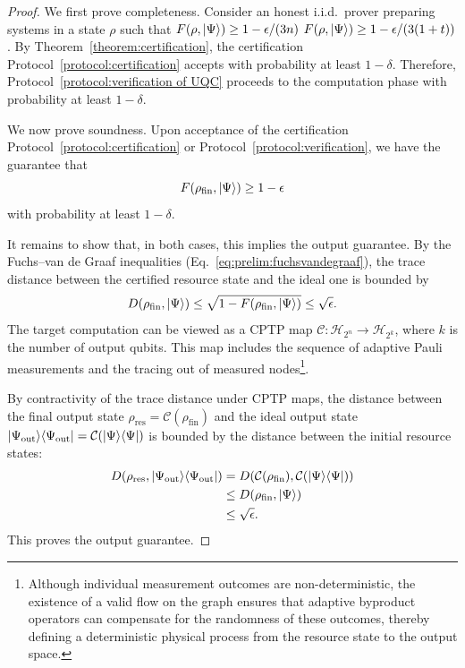 \documentclass[a4paper,twocolumn,11pt,unpublished]{../../revision/quantumarticle}
\newcommand{\ketbra}[1]{\ket{#1}\!\bra{#1}}
\providecommand{\DIFadd}[1]{{\protect\color{blue} \sf #1}} %
\providecommand{\DIFdel}[1]{{\protect\color{red} \scriptsize #1}} %
\providecommand{\DIFaddbegin}{} %
\providecommand{\DIFaddend}{} %
\providecommand{\DIFdelbegin}{} %
\providecommand{\DIFdelend}{} %
\begin{document}
\begin{proof}
    We first prove completeness. Consider an honest i.i.d.\ prover preparing systems in a state $\rho$ such that \DIFdelbegin \DIFdel{$F(\rho,\ket{\Psi})\geq 1-\epsilon/(3n)$}\DIFdelend \DIFaddbegin \DIFadd{$F(\rho,\ket{\Psi})\geq 1-\epsilon/(3(1+t))$}\DIFaddend . By Theorem~\ref{theorem:certification}, the certification Protocol~\ref{protocol:certification} accepts with probability at least $1-\delta$. Therefore, Protocol~\ref{protocol:verification of UQC} proceeds to the computation phase with probability at least $1-\delta$.

    We now prove soundness. Upon acceptance of the certification Protocol~\ref{protocol:certification} or Protocol~\ref{protocol:verification}, we have the guarantee that
    \begin{equation}
        F(\rho_{\mathrm{fin}}, \ket\Psi) \geq 1-\epsilon
    \end{equation}
    with probability at least $1-\delta$.

    It remains to show that, in both cases, this implies the output guarantee. By the Fuchs--van de Graaf inequalities (Eq.~\eqref{eq:prelim:fuchsvandegraaf}), the trace distance between the certified resource state and the ideal one is bounded by
    \begin{equation}
        D(\rho_{\mathrm{fin}}, \ket\Psi) \leq \sqrt{1 - F(\rho_{\mathrm{fin}}, \ket\Psi)} \leq \sqrt{\epsilon}.
    \end{equation}
    The target computation can be viewed as a CPTP map $\mathcal{C}: \mathcal{H}_{2^n} \to \mathcal{H}_{2^k}$, where $k$ is the number of output qubits. This map includes the sequence of adaptive Pauli measurements and the tracing out of measured nodes\footnote{Although individual measurement outcomes are non-deterministic, the existence of a valid flow on the graph ensures that adaptive byproduct operators can compensate for the randomness of these outcomes, thereby defining a deterministic physical process from the resource state to the output space.}.

    By contractivity of the trace distance under CPTP maps, the distance between the final output state $\rho_{\mathrm{res}} = \mathcal{C}(\rho_{\mathrm{fin}})$ and the ideal output state $\ketbra{\Psi_{\rm out}} = \mathcal{C}(\ketbra{\Psi})$ is bounded by the distance between the initial resource states:
    \begin{align}
        D(\rho_{\mathrm{res}}, \ketbra{\Psi_{\rm out}})
        &= D(\mathcal{C}(\rho_{\mathrm{fin}}), \mathcal{C}(\ketbra{\Psi})) \nonumber \\
        &\leq D(\rho_{\mathrm{fin}}, \ket{\Psi}) \nonumber \\
        &\leq \sqrt{\epsilon}. \nonumber
    \end{align}
    This proves the output guarantee.
\end{proof}
\end{document}
